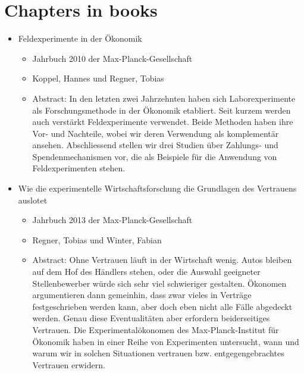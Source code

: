 \documentclass[a4paper,10pt]{article}
\begin{document}

	
\section{Chapters in books}

\begin{itemize}

\item Feldexperimente in der \"{O}konomik

\begin{itemize}
\item Jahrbuch 2010 der Max-Planck-Gesellschaft
\item Koppel, Hannes und Regner, Tobias
\item Abstract: \tiny In den letzten zwei Jahrzehnten haben sich Laborexperimente als Forschungsmethode in der \"{O}konomik etabliert. Seit kurzem werden auch verst\"{a}rkt Feldexperimente verwendet. Beide Methoden haben ihre Vor- und Nachteile, wobei wir deren Verwendung als komplement\"{a}r ansehen. Abschliessend stellen wir drei Studien \"{u}ber Zahlungs- und Spendenmechanismen vor, die als Beispiele f\"{u}r die Anwendung von Feldexperimenten stehen.
\end{itemize}

\item Wie die experimentelle Wirtschaftsforschung die Grundlagen des Vertrauens auslotet

\begin{itemize}
\item Jahrbuch 2013 der Max-Planck-Gesellschaft
\item Regner, Tobias und Winter, Fabian
\item Abstract: \tiny Ohne Vertrauen l\"{a}uft in der Wirtschaft wenig. Autos bleiben auf dem Hof des H\"{a}ndlers stehen, oder die Auswahl geeigneter Stellenbewerber w\"{u}rde sich sehr viel schwieriger gestalten. \"{O}konomen argumentieren dann gemeinhin,  dass zwar vieles in Vertr\"{a}ge festgeschrieben werden kann, aber doch eben nicht alle F\"{a}lle abgedeckt werden. Genau diese Eventualit\"{a}ten aber erfordern beiderseitiges Vertrauen. Die Experimental\"{o}konomen des Max-Planck-Institut f\"{u}r \"{O}konomik haben in einer Reihe von Experimenten untersucht, wann und warum wir in solchen Situationen vertrauen bzw. entgegengebrachtes Vertrauen erwidern.
\end{itemize}

\end{itemize}
\end{document}
